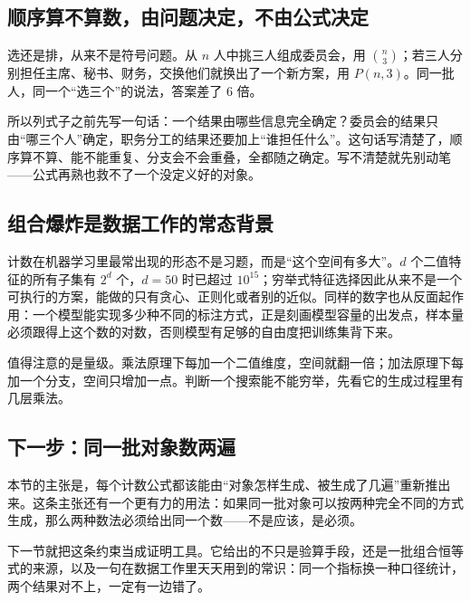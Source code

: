 \subsection{顺序算不算数，由问题决定，不由公式决定}

选还是排，从来不是符号问题。从 \(n\) 人中挑三人组成委员会，用 \(\binom n3\)；若三人分别担任主席、秘书、财务，交换他们就换出了一个新方案，用 \(P(n,3)\)。同一批人，同一个``选三个''的说法，答案差了 6 倍。

所以列式子之前先写一句话：一个结果由哪些信息完全确定？委员会的结果只由``哪三个人''确定，职务分工的结果还要加上``谁担任什么''。这句话写清楚了，顺序算不算、能不能重复、分支会不会重叠，全都随之确定。写不清楚就先别动笔——公式再熟也救不了一个没定义好的对象。

\subsection{组合爆炸是数据工作的常态背景}

计数在机器学习里最常出现的形态不是习题，而是``这个空间有多大''。\(d\) 个二值特征的所有子集有 \(2^d\) 个，\(d=50\) 时已超过 \(10^{15}\)；穷举式特征选择因此从来不是一个可执行的方案，能做的只有贪心、正则化或者别的近似。同样的数字也从反面起作用：一个模型能实现多少种不同的标注方式，正是刻画模型容量的出发点，样本量必须跟得上这个数的对数，否则模型有足够的自由度把训练集背下来。

值得注意的是量级。乘法原理下每加一个二值维度，空间就翻一倍；加法原理下每加一个分支，空间只增加一点。判断一个搜索能不能穷举，先看它的生成过程里有几层乘法。

\subsection{下一步：同一批对象数两遍}

本节的主张是，每个计数公式都该能由``对象怎样生成、被生成了几遍''重新推出来。这条主张还有一个更有力的用法：如果同一批对象可以按两种完全不同的方式生成，那么两种数法必须给出同一个数——不是应该，是必须。

下一节就把这条约束当成证明工具。它给出的不只是验算手段，还是一批组合恒等式的来源，以及一句在数据工作里天天用到的常识：同一个指标换一种口径统计，两个结果对不上，一定有一边错了。
